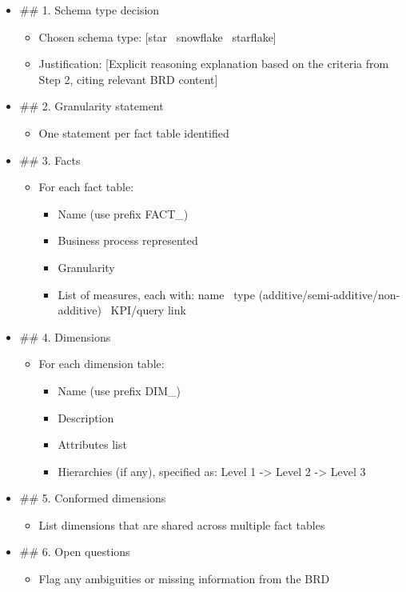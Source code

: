 \begin{itemize}
    \item \#\# 1. Schema type decision
    \begin{itemize}
        \item Chosen schema type: [star \textbar\ snowflake \textbar\ starflake]
        \item Justification: [Explicit reasoning explanation based on the criteria from Step 2, citing relevant BRD content]
    \end{itemize}
    \item \#\# 2. Granularity statement
    \begin{itemize}
        \item One statement per fact table identified
    \end{itemize}
    \item \#\# 3. Facts
    \begin{itemize}
        \item For each fact table:
        \begin{itemize}
            \item Name (use prefix FACT\_)
            \item Business process represented
            \item Granularity
            \item List of measures, each with: name \textbar\ type (additive/semi-additive/non-additive) \textbar\ KPI/query link
        \end{itemize}
    \end{itemize}
    \item \#\# 4. Dimensions
    \begin{itemize}
        \item For each dimension table:
        \begin{itemize}
            \item Name (use prefix DIM\_)
            \item Description
            \item Attributes list
            \item Hierarchies (if any), specified as: Level 1 -> Level 2 -> Level 3
        \end{itemize}
    \end{itemize}
    \item \#\# 5. Conformed dimensions
    \begin{itemize}
        \item List dimensions that are shared across multiple fact tables
    \end{itemize}
    \item \#\# 6. Open questions
    \begin{itemize}
        \item Flag any ambiguities or missing information from the BRD
    \end{itemize}
\end{itemize}

